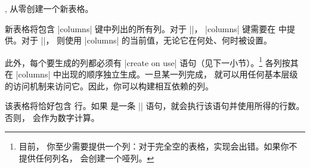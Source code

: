 \documentclass[a4paper,doc2]{ltxdoc}
\begin{document}
\begin{commandlist}{%
    \pgfplotstablenew{},
    \pgfplotstablenew*{}%
}
    从零创建一个新表格。

    新表格将包含 |columns| 键中列出的所有列。对于 |\pgfplotstablenew|，
    |columns| 键需要在  中提供。对于 |\pgfplotstablenew*|，
    则使用 |columns| 的当前值，无论它在何处、何时被设置。

    此外，每个要生成的列都必须有 |create on use| 语句（见下一小节）。\footnote{目前，
    你至少需要提供一个列：对于完全空的表格，实现会出错。如果你不提供任何列名，
    会创建一个哑列。} 各列按其在 |columns| 中出现的顺序独立生成。一旦某一列完成，
    就可以用任何基本层级的访问机制来访问它。因此，你可以构建相互依赖的列。

    该表格将恰好包含  行。如果  是一条
    |\pgfplotstablegetrowsof| 语句，就会执行该语句并使用所得的行数。否则，
     会作为数字计算。
\begin{codeexample}[]
\loadedtable
\pgfplotstabletypeset[empty cells with={---}]\loadedtable
\end{codeexample}

\begin{codeexample}[]
    \loadedtable
\pgfplotstabletypeset\loadedtable
\end{codeexample}
\end{commandlist}
\end{document}
